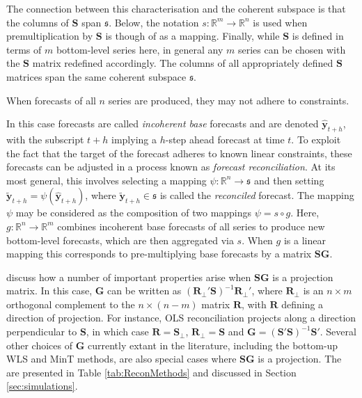 \documentclass[12pt]{article}
\theoremstyle{definition}
\begin{document}
The connection between this characterisation and the coherent subspace is that the columns of $\bm{S}$ span $\mathfrak{s}$.  Below, the notation $s:\mathbb{R}^m\rightarrow\mathbb{R}^n$ is used when premultiplication by $\bm{S}$ is though of as a mapping.  Finally, while $\bm{S}$ is defined in terms of $m$ bottom-level series here, in general any $m$ series can be chosen with the $\bm{S}$ matrix redefined accordingly.  The columns of all appropriately defined $\bm{S}$ matrices span the same coherent subspace $\mathfrak{s}$.

When forecasts of all $n$ series are produced, they may not adhere to constraints.

In this case forecasts are called {\em incoherent base} forecasts and are denoted $\hat{\bm y}_{t+h}$, with the subscript $t+h$ implying a $h$-step ahead forecast at time $t$.  To exploit the fact that the target of the forecast adheres to known linear constraints, these forecasts can be adjusted in a process known as {\em forecast reconciliation}.  At its most general, this involves selecting a mapping $\psi:\mathbb{R}^n\rightarrow\mathfrak{s}$ and then setting $\tilde{\bm y}_{t+h}=\psi(\hat{\bm y}_{t+h})$, where $\tilde{\bm y}_{t+h}\in\mathfrak{s}$ is called the {\em reconciled} forecast.  The mapping $\psi$ may be considered as the composition of two mappings $\psi=s\circ g$. Here, $g:\mathbb{R}^{n}\rightarrow\mathbb{R}^{m}$ combines incoherent base forecasts of all series to produce new bottom-level forecasts, which are then aggregated via $s$.  When $g$ is a linear mapping this corresponds to pre-multiplying base forecasts by a matrix $\bm{S}\bm{G}$.

\cite{PanEtAl2019HF} discuss how a number of important properties arise when $\bm{S}\bm{G}$ is a projection matrix.  In this case, ${\bm G}$ can be written as $(\bm{R}_{\perp}'\bm{S})^{-1}\bm{R}_{\perp}'$, where $\bm{R}_{\perp}$ is an $n\times m$ orthogonal complement to the $n\times(n-m)$ matrix $\bm{R}$, with $\bm{R}$ defining a direction of projection.  For instance, OLS reconciliation \citep{HynEtAl2011} projects along a direction perpendicular to $\bm{S}$, in which case $\bm{R}=\bm{S}_{\perp}$, $\bm{R}_{\perp}=\bm{S}$ and $\bm{G}=(\bm{S}'\bm{S})^{-1}\bm{S}'$.  Several other choices of $\bm{G}$ currently extant in the literature, including the bottom-up \citep{Dunn1976} WLS \citep[][]{Hyndman2016,AthEtAl2017} and MinT \citep{WicEtAl2019} methods, are also special cases where $\bm{S}\bm{G}$ is a projection. The are presented in Table \ref{tab:ReconMethods} and discussed in Section \ref{sec:simulations}.
\end{document}
